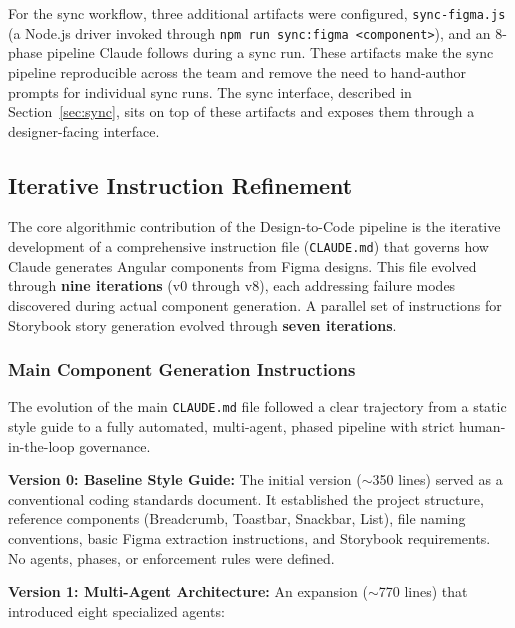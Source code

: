 For the sync workflow, three additional artifacts were configured, \texttt{sync-figma.js} (a Node.js driver invoked through \texttt{npm run sync:figma <component>}), and an 8-phase pipeline Claude follows during a sync run. These artifacts make the sync pipeline reproducible across the team and remove the need to hand-author prompts for individual sync runs. The sync interface, described in Section~\ref{sec:sync}, sits on top of these artifacts and exposes them through a designer-facing interface.

\subsection{Iterative Instruction Refinement}
\label{sec:instruction-engineering}

The core algorithmic contribution of the Design-to-Code pipeline is the iterative development of a comprehensive instruction file (\texttt{CLAUDE.md}) that governs how Claude generates Angular components from Figma designs. This file evolved through \textbf{nine iterations} (v0 through v8), each addressing failure modes discovered during actual component generation. A parallel set of instructions for Storybook story generation evolved through \textbf{seven iterations}.

\subsubsection{Main Component Generation Instructions}

The evolution of the main \texttt{CLAUDE.md} file followed a clear trajectory from a static style guide to a fully automated, multi-agent, phased pipeline with strict human-in-the-loop governance.

\textbf{Version 0: Baseline Style Guide:} The initial version ($\sim$350 lines) served as a conventional coding standards document. It established the project structure, reference components (Breadcrumb, Toastbar, Snackbar, List), file naming conventions, basic Figma extraction instructions, and Storybook requirements. No agents, phases, or enforcement rules were defined.

\textbf{Version 1: Multi-Agent Architecture:} An expansion ($\sim$770 lines) that introduced eight specialized agents:

